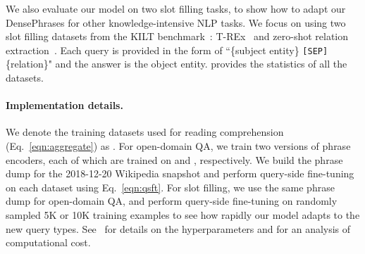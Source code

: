 \documentclass[11pt,a4paper]{article}
\newcommand{\ours}{DensePhrases}
\newcommand\ttt[1]{\texttt{#1}}
\begin{document}
We also evaluate our model on two {slot filling} tasks, to show how to adapt our {\ours} for other knowledge-intensive NLP tasks.
We focus on using two slot filling datasets from the KILT benchmark~\citep{petroni2020kilt}: T-REx~\citep{elsahar2018t} and zero-shot relation extraction~\citep{levy2017zero}.
Each query is provided in the form of ``\{subject entity\} \ttt{[SEP]} \{relation\}" and the answer is the object entity.
 provides the statistics of all the datasets.

\paragraph{Implementation details.}
We denote the training datasets used for reading comprehension (Eq.~\eqref{eqn:aggregate}) as .
For open-domain QA, we train two versions of phrase encoders, each of which are trained on  and , respectively.
We build the phrase dump  for the 2018-12-20 Wikipedia snapshot and perform query-side fine-tuning on each dataset using Eq.~\eqref{eqn:qsft}.
For slot filling, we use the same phrase dump for open-domain QA,    and perform query-side fine-tuning on randomly sampled 5K or 10K training examples to see how rapidly our model adapts to the new query types.
See~ for details on the hyperparameters and  for an analysis of computational cost.
\end{document}
